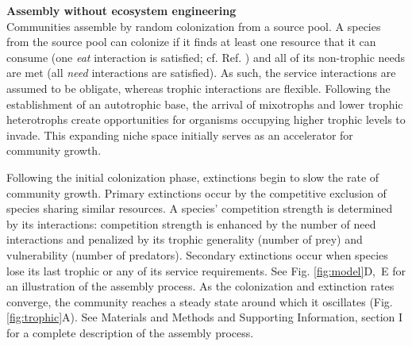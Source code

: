 \documentclass[9pt,twocolumn,twoside]{pnas-new}
\begin{document}
\vspace{-3mm}
\noindent \textbf{Assembly without ecosystem engineering}\\
\noindent Communities assemble by random colonization from a source pool.
A species from the source pool can colonize if it finds at least one resource that it can consume (one \emph{eat} interaction is satisfied; cf. Ref. ) and all of its non-trophic needs are met (all \emph{need} interactions are satisfied). 
As such, the service interactions are assumed to be obligate, whereas trophic interactions are flexible.
Following the establishment of an autotrophic base, the arrival of mixotrophs and lower trophic heterotrophs create opportunities for organisms occupying higher trophic levels to invade.
This expanding niche space initially serves as an accelerator for community growth.

Following the initial colonization phase, extinctions begin to slow the rate of community growth.
Primary extinctions occur by the competitive exclusion of species sharing similar resources.
A species' competition strength is determined by its interactions: competition strength is enhanced by the number of need interactions and penalized by its trophic generality (number of prey) and vulnerability (number of predators).
Secondary extinctions occur when species lose its last trophic or any of its service requirements.
See Fig. \ref{fig:model}D,~E for an illustration of the assembly process. 
As the colonization and extinction rates converge, the community reaches a steady state around which it oscillates (Fig. \ref{fig:trophic}A).
See Materials and Methods and Supporting Information, section I for a complete description of the assembly process. %
\end{document}
